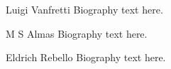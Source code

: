 \documentclass[journal]{IEEEtran}
\begin{document}
\begin{IEEEbiography}{Luigi Vanfretti}
Biography text here.
\end{IEEEbiography}

\begin{IEEEbiography}{M S Almas}
Biography text here.
\end{IEEEbiography}

\begin{IEEEbiographynophoto}{Eldrich Rebello}
Biography text here.
\end{IEEEbiographynophoto}







\end{document}
